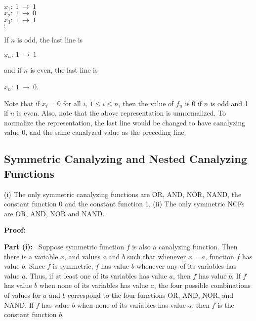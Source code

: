 \smallskip

\noindent
\hspace*{0.5in}
$x_1:~ 1 ~\longrightarrow~ 1$ \\
\hspace*{0.5in}
$x_2:~ 1 ~\longrightarrow~ 0$ \\
\hspace*{0.5in}
$x_3:~ 1 ~\longrightarrow~ 1$ \\
\hspace*{0.75in}
$\vdots$ 

\noindent
If $n$ is odd, the last line is 

\noindent
\hspace*{0.5in}
$x_n:~ 1 ~\longrightarrow~ 1$ 

\noindent
and if $n$ is even, the last line is 

\noindent
\hspace*{0.5in}
$x_n:~ 1 ~\longrightarrow~ 0$. 

\smallskip

\noindent
Note that if $x_i = 0$ for all $i$, $1 \leq i \leq n$, then the
value of $f_n$ is 0 if $n$ is odd and 1 if $n$ is even.  Also, note
that the above representation is unnormalized. To normalize the
representation, the last line would be changed to have canalyzing
value 0, and the same canalyzed value as the preceding line.

\subsection{Symmetric Canalyzing and Nested Canalyzing Functions}
\label{sse:sym_and_cf_ncf}

\begin{proposition}\label{pro:ncf_symmetric}
(i) The only symmetric canalyzing functions are OR, AND, NOR, NAND, 
the constant function 0 and the constant function 1.
(ii) The only symmetric NCFs are OR, AND, NOR and NAND.
\end{proposition}
\noindent
\textbf{Proof:}~

\smallskip

\noindent
\textbf{Part (i):}~
Suppose symmetric function $f$ is also a canalyzing function. 
Then there is a variable $x$, and values $a$ and $b$ 
such that whenever $x = a$, function $f$ has value $b$.  
Since $f$ is symmetric, $f$  has
value $b$ whenever any of its variables has value $a$.  
Thus, if at least one of its variables has value $a$, then $f$ has value $b$.  
If $f$ has value $\overline{b}$ when none of its variables has
value $a$, the four possible combinations of values for $a$ and $b$
correspond to the four functions OR, AND, NOR, and NAND.  If $f$
has value $b$ when none of its variables has value $a$, then $f$
is the constant function $b$.

